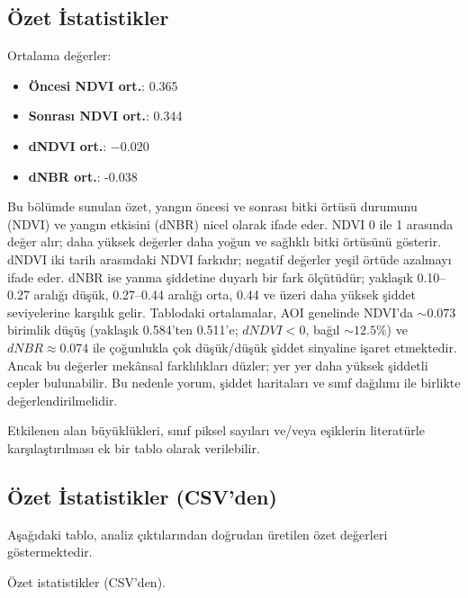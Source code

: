 \documentclass[11pt,a4paper]{article}
\begin{document}
\subsection{Özet İstatistikler}
\noindent Ortalama değerler:
\begin{itemize}
  \item \textbf{Öncesi NDVI ort.}: 0.365
  \item \textbf{Sonrası NDVI ort.}: 0.344
  \item \textbf{dNDVI ort.}: $-0.020$
  \item \textbf{dNBR ort.}: -0.038
\end{itemize}
Bu bölümde sunulan özet, yangın öncesi ve sonrası bitki örtüsü durumunu (NDVI) ve yangın etkisini (dNBR) nicel olarak ifade eder. NDVI 0 ile 1 arasında değer alır; daha yüksek değerler daha yoğun ve sağlıklı bitki örtüsünü gösterir. dNDVI iki tarih arasındaki NDVI farkıdır; negatif değerler yeşil örtüde azalmayı ifade eder. dNBR ise yanma şiddetine duyarlı bir fark ölçütüdür; yaklaşık 0.10--0.27 aralığı düşük, 0.27--0.44 aralığı orta, 0.44 ve üzeri daha yüksek şiddet seviyelerine karşılık gelir. Tablodaki ortalamalar, AOI genelinde NDVI’da \(\sim0.073\) birimlik düşüş (yaklaşık 0.584'ten 0.511'e; \(dNDVI<0\), bağıl \(\sim12.5\%\)) ve \(dNBR \approx 0.074\) ile çoğunlukla çok düşük/düşük şiddet sinyaline işaret etmektedir. Ancak bu değerler mekânsal farklılıkları düzler; yer yer daha yüksek şiddetli cepler bulunabilir. Bu nedenle yorum, şiddet haritaları ve sınıf dağılımı ile birlikte değerlendirilmelidir.

Etkilenen alan büyüklükleri, sınıf piksel sayıları ve/veya eşiklerin literatürle
karşılaştırılması ek bir tablo olarak verilebilir.

\subsection{Özet İstatistikler (CSV’den)}
Aşağıdaki tablo, analiz çıktılarından doğrudan üretilen özet değerleri göstermektedir.
\begin{table}[H]
  \centering
  \caption{Özet istatistikler (CSV'den).}
\end{table}
\end{document}
